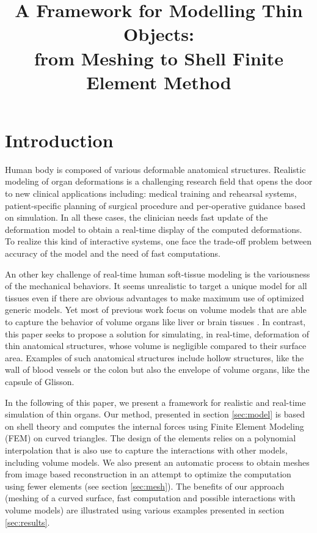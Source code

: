 \documentclass{llncs}
\newcommand{\CD}[1]{{\color{magenta}{\textbf{CD: #1}}}}
\begin{document}
\title{A Framework for Modelling Thin Objects: \\ from Meshing to Shell Finite Element Method}

\maketitle

\begin{abstract}

\end{abstract}

\section{Introduction}

Human body is composed of various deformable anatomical structures. 
Realistic modeling of organ deformations is a challenging research field that opens the door to new clinical applications including: medical training and rehearsal systems, patient-specific planning of surgical procedure and per-operative guidance based on simulation.
In all these cases, the clinician needs fast update of the deformation model to obtain a real-time display of the computed deformations.  
To realize this kind of interactive systems, one face the trade-off problem between accuracy of the model and the need of fast computations. 

An other key challenge of real-time human soft-tissue modeling is the variousness of the mechanical behaviors. 
It seems unrealistic to target a unique model for all tissues even if there are obvious advantages to make maximum use of optimized generic models.
Yet most of previous work focus on volume models that are able to capture the behavior of volume organs like liver \cite{} or brain tissues \cite{} \CD{TODO: biblio}.
In contrast, this paper seeks to propose a solution for simulating, in real-time, deformation of thin anatomical structures, whose volume is negligible compared to their surface area.
Examples of such anatomical structures include hollow structures, like the wall of blood vessels or the colon but also the envelope of volume organs, like the capsule of Glisson.


In the following of this paper, we present a framework for realistic and real-time simulation of thin organs.
Our method, presented in section \ref{sec:model} is based on shell theory and computes the internal forces using Finite Element Modeling (FEM) on curved triangles.
The design of the elements relies on a polynomial interpolation that is also use to capture the interactions with other models, including volume models.
We also present an automatic process to obtain meshes from image based reconstruction in an attempt to optimize  the computation using fewer elements  (see section \ref{sec:mesh}).
The benefits of our approach (meshing of a curved surface, fast computation and possible interactions with volume models) are illustrated using various examples presented in section \ref{sec:results}. 
\end{document}
